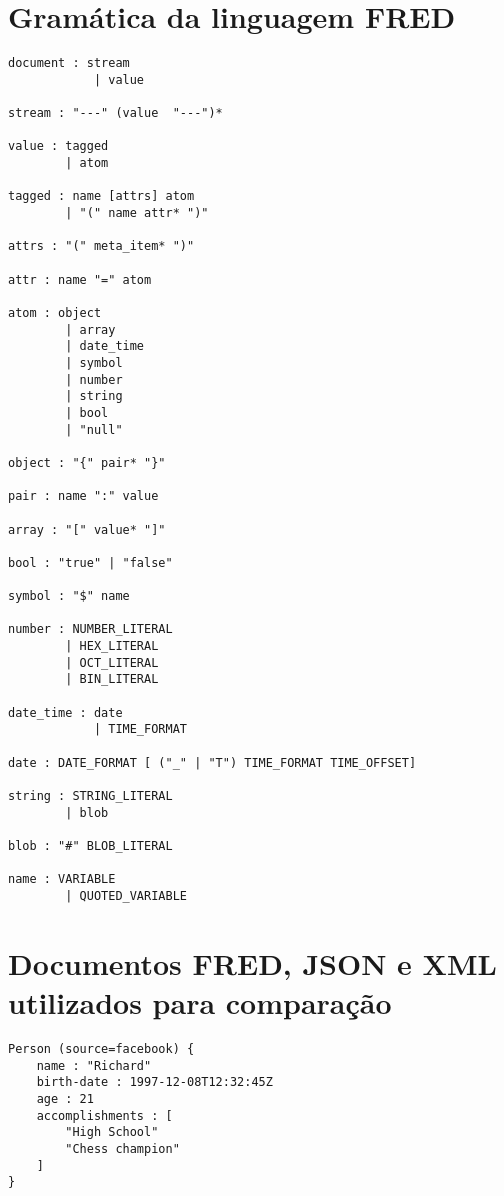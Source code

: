 \begin{apendicesenv}

\partapendices

\chapter{Gramática da linguagem FRED}
\label{sec:fredgrammar}

\begin{lstlisting}[caption=Gramática em notação LARK para linguagem FRED,label={lst:fredgrammar}]
document : stream
            | value

stream : "---" (value  "---")*

value : tagged
        | atom

tagged : name [attrs] atom
        | "(" name attr* ")" 

attrs : "(" meta_item* ")"

attr : name "=" atom

atom : object
        | array
        | date_time
        | symbol
        | number
        | string
        | bool
        | "null"

object : "{" pair* "}"

pair : name ":" value

array : "[" value* "]"

bool : "true" | "false"

symbol : "$" name

number : NUMBER_LITERAL 
        | HEX_LITERAL
        | OCT_LITERAL
        | BIN_LITERAL 

date_time : date
            | TIME_FORMAT

date : DATE_FORMAT [ ("_" | "T") TIME_FORMAT TIME_OFFSET]

string : STRING_LITERAL
        | blob

blob : "#" BLOB_LITERAL

name : VARIABLE
        | QUOTED_VARIABLE

\end{lstlisting}

\chapter{Documentos FRED, JSON e XML utilizados para comparação}
\label{sec:docsexamples}

\begin{lstlisting}[caption=Exemplo de documento FRED,label={lst:freddoc1}]
Person (source=facebook) {
    name : "Richard"
    birth-date : 1997-12-08T12:32:45Z
    age : 21
    accomplishments : [
        "High School"
        "Chess champion"
    ]
}
\end{lstlisting}


\end{apendicesenv}
